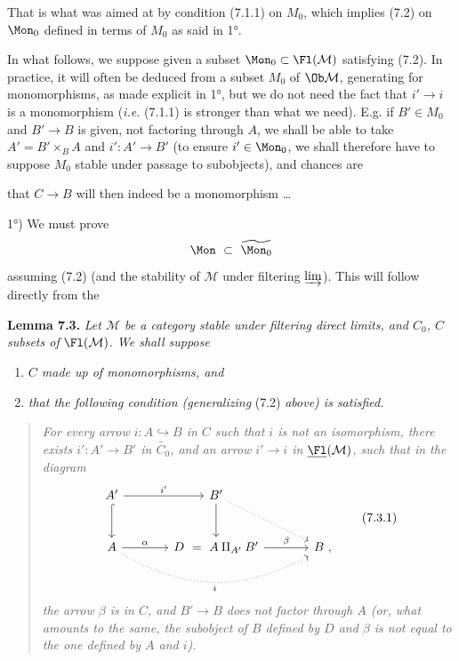 That is what was aimed at by condition (7.1.1) on $M_0$, which implies (7.2) on $\Mon_0$ defined in terms of $M_0$ as said in 1°.


In what follows, we suppose given a subset $\Mon_0 \subset \Fl(\mathcal{M})$ satisfying (7.2). In practice, it will often be deduced from a subset $M_0$ of $\Ob \mathcal{M}$, generating for monomorphisms, as made explicit in 1°, but we do not need the fact that $i' \longrightarrow i$ is a monomorphism (\textit{i.e.} (7.1.1) is stronger than what we need). E.g. if $B' \in M_0$ and $B' \longrightarrow B$ is given, not factoring through $A$, we shall be able to take $A' = B' \times_B A$ and $i' : A' \longrightarrow B'$ (to ensure $i' \in \Mon_0$, we shall therefore have to suppose $M_0$ stable under passage to subobjects), and chances are


that $C \longrightarrow B$ will then indeed be a monomorphism \ldots

1°) We must prove
\[
\Mon \ \subset \ \widetilde{\Mon_0}
\]
assuming (7.2) (and the stability of $\mathcal{M}$ under filtering $\varinjlim$). This will follow directly from the

\textbf{Lemma 7.3.} \textit{Let $\mathcal{M}$ be a category stable under filtering direct limits, and $C_0$, $C$ subsets of} $\Fl(\mathcal{M})$\textit{. We shall suppose}
\begin{enumerate}[label={}]
\item[\cercle{a}] \textit{$C$ made up of monomorphisms, and}
\item[\cercle{b}] \textit{that the following condition (generalizing} (7.2) \textit{above) is satisfied.}
\end{enumerate}

\begin{quote}
\textit{For every arrow $i : A \hookrightarrow B$ in $C$ such that $i$ is not an isomorphism, there exists $i' : A' \longrightarrow B'$ in $\widetilde{C_0}$, and an arrow $i' \longrightarrow i$ in} $\underline{\Fl}(\mathcal{M})$\textit{, such that in the diagram}
\[
\begin{tikzcd}[row sep=large, column sep=large]
A' \arrow[r, "{i'}"] \arrow[d, hook] & B' \arrow[d] \arrow[rd, dotted] & \\
A \arrow[r, "\alpha"] \arrow[rr, dotted, bend right, "i"'] & D \ = \ A \amalg_{A'} B' \arrow[r, "\beta"] & B \ ,
\end{tikzcd}
\tag*{(7.3.1)}
\]
\textit{the arrow $\beta$ is in $C$, and $B' \longrightarrow B$ does not factor through $A$ (or, what amounts to the same, the subobject of $B$ defined by $D$ and $\beta$ is not equal to the one defined by $A$ and $i$).}
\end{quote}

